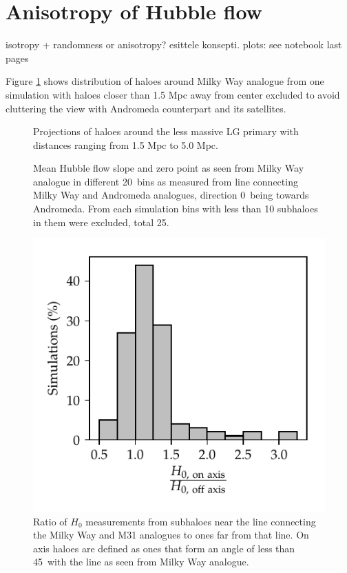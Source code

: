 \documentclass[english, oneside]{HYgradu}
\begin{document}
\section{Anisotropy of Hubble flow}
isotropy + randomness or anisotropy? esittele konsepti. plots: see notebook last pages

Figure \ref{fig:mollweide-anisotropy} shows distribution of haloes around Milky Way analogue from one simulation with haloes closer than 1.5 Mpc away from center excluded to avoid cluttering the view with Andromeda counterpart and its satellites.

\begin{figure}
    \centering
    
    \caption{Projections of haloes around the less massive LG primary with distances ranging from 1.5 Mpc to 5.0 Mpc.}\label{fig:mollweide-anisotropy}
\end{figure}

\begin{figure}
    \centering
    
    \caption{Mean Hubble flow slope and zero point as seen from Milky Way analogue in different 20\textdegree\ bins as measured from line connecting Milky Way and Andromeda analogues, direction 0\textdegree\ being towards Andromeda. From each simulation bins with less than 10 subhaloes in them were excluded, total 25.}\label{fig:directionalHF}
\end{figure}

\begin{figure}
    \centering
    \includegraphics{kuvat/directionalHF-ratios.pdf}
    \caption{Ratio of $H_0$ measurements from subhaloes near the line connecting the Milky Way and M31 analogues to ones far from that line. On axis haloes are defined as ones that form an angle of less than 45\textdegree\ with the line as seen from Milky Way analogue.}\label{fig:directionalHF}
\end{figure}
\end{document}
